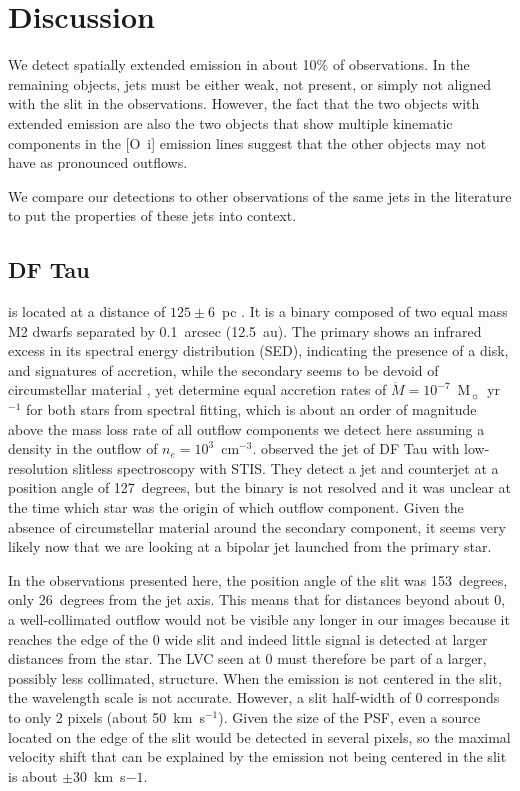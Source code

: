 \documentclass[twocolumn]{aastex62}
\begin{document}
\section{Discussion}
\label{sect:discussion}
We detect spatially extended emission in about 10\% of observations. In the
remaining objects, jets must be either weak, not present, or simply not aligned
with the slit in the observations. However, the fact that the two objects with
extended emission are also the two objects that show multiple kinematic
components in the [O~{\sc i}] emission lines \citep{2003ApJ...583..334H}
suggest that the other objects may not have as pronounced outflows.

We compare our detections to other observations of the same jets in the literature to put the properties of these jets into context.

\subsection{DF Tau}

 is located at a distance of $125\pm6$~pc
\citep{2016A&A...595A...1G,2018A&A...616A...1G}. It is a binary composed of two
equal mass M2 dwarfs separated by 0.1~arcsec (12.5~au). The primary shows an
infrared excess in its spectral energy distribution (SED), indicating the
presence of a disk, and signatures of accretion, while the secondary seems to
be devoid of circumstellar material \citep{2017ApJ...845..161A}, yet
\citet{2003ApJ...583..334H} determine equal accretion rates of $\dot
M=10^{-7}$~M$_{\sun}$~yr$^{-1}$ for both stars from spectral fitting, which is
about an order of magnitude above the mass loss rate of all outflow components
we detect here assuming a density in the outflow of $n_e=10^3$~cm$^{-3}$.
\citet{2004ApJ...609..261H} observed the jet of DF Tau with low-resolution slitless spectroscopy with STIS. They detect a jet and counterjet at a
position angle of 127~degrees, but the binary is not resolved and it was unclear at the time which star was the origin of which outflow component. Given the absence of circumstellar material around the secondary component, it seems very likely now that we are looking at a bipolar jet launched from the primary star. 

In the observations presented here, the position angle of the slit was 153~degrees, only 26~degrees from the jet axis. This means that for distances beyond about 0, a well-collimated outflow would not be visible any longer in our images because it reaches the edge of the 0 wide slit and indeed little signal is detected at larger distances from the star. The LVC seen at 0 must therefore be part of a larger, possibly less collimated, structure. When the emission is not centered in the slit, the wavelength scale is not accurate. However, a slit half-width of 0 corresponds to only 2 pixels (about 50~km~s$^{-1}$). Given the size of the PSF, even a source located on the edge of the slit would be detected in several pixels, so the maximal velocity shift that can be explained by the emission not being centered in the slit is about $\pm30$~km~s${-1}$.
\end{document}
